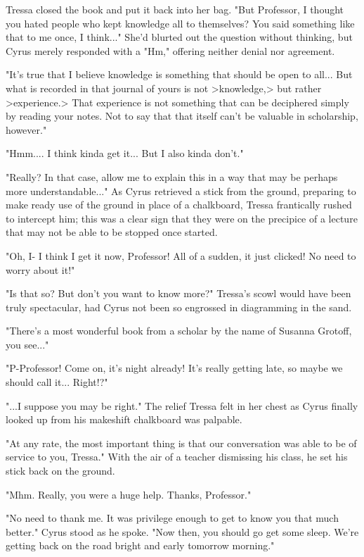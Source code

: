 Tressa closed the book and put it back into her bag. "But Professor, I thought you hated people who kept knowledge all to themselves? You said something like that to me once, I think..." She'd blurted out the question without thinking, but Cyrus merely responded with a "Hm," offering neither denial nor agreement. 

"It's true that I believe knowledge is something that should be open to all... But what is recorded in that journal of yours is not >knowledge,> but rather >experience.> That experience is not something that can be deciphered simply by reading your notes. Not to say that that itself can't be valuable in scholarship, however."

"Hmm.... I think kinda get it... But I also kinda don't."

"Really? In that case, allow me to explain this in a way that may be perhaps more understandable..." As Cyrus retrieved a stick from the ground, preparing to make ready use of the ground in place of a chalkboard, Tressa frantically rushed to intercept him; this was a clear sign that they were on the precipice of a lecture that may not be able to be stopped once started.

"Oh, I- I think I get it now, Professor! All of a sudden, it just clicked! No need to worry about it!"

"Is that so? But don't you want to know more?" Tressa's scowl would have been truly spectacular, had Cyrus not been so engrossed in diagramming in the sand.

"There's a most wonderful book from a scholar by the name of Susanna Grotoff, you see..."

"P-Professor! Come on, it's night already! It's really getting late, so maybe we should call it... Right!?"

"...I suppose you may be right." The relief Tressa felt in her chest as Cyrus finally looked up from his makeshift chalkboard was palpable.

"At any rate, the most important thing is that our conversation was able to be of service to you, Tressa." With the air of a teacher dismissing his class, he set his stick back on the ground.

"Mhm. Really, you were a huge help. Thanks, Professor."

"No need to thank me. It was privilege enough to get to know you that much better." Cyrus stood as he spoke. "Now then, you should go get some sleep. We're getting back on the road bright and early tomorrow morning."

